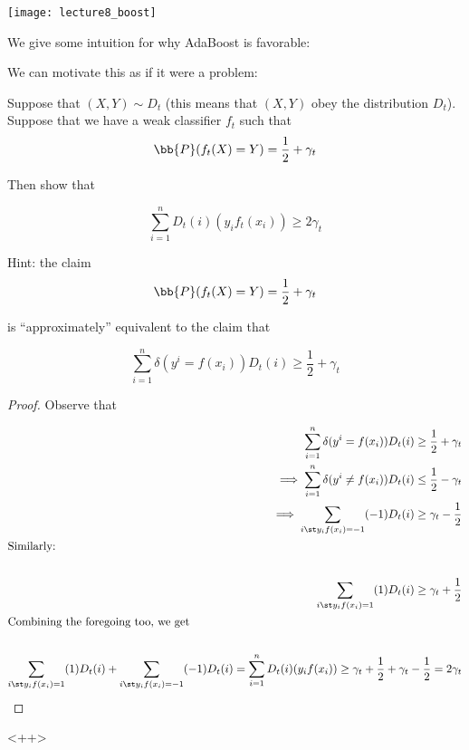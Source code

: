 \documentclass[../main.tex]{subfiles}
\begin{document}
    \begin{center}
        \texttt{[image: lecture8\_boost]}
    \end{center}

    \begin{remark}
        We give some intuition for why AdaBoost is favorable:

        We can motivate this as if it were a problem:

        \begin{problem}{1}
            Suppose that $(X,Y) \sim D_t$ (this means that $(X,Y)$ obey the distribution
            $D_t$). Suppose that we have a weak classifier $f_t$ such that
            \[
                \bb{P}(f_{t}(X) = Y) = \frac{1}{2} + \gamma_t
            \]

            Then show that

            \[
                \sum_{i=1}^{n}D_{t}(i)\left(y_{i}f_{t}(x_{i}) \right) \geq 2\gamma_t
            \]

            Hint: the claim
            \[
                \bb{P}(f_{t}(X) = Y) = \frac{1}{2} + \gamma_t
            \]

            is ``approximately'' equivalent to the claim that

            \[
                \sum_{i=1}^{n}\delta(y^{i} = f(x_i))D_t(i) \geq \frac{1}{2} + \gamma_t
            \]
        \end{problem}

        \begin{proof}
            
            Observe that

            \begin{align*}
                \sum_{i=1}^{n}\delta(y^{i} = f(x_i))D_t(i) \geq \frac{1}{2} + \gamma_t \\
                \implies \sum_{i=1}^{n}\delta(y^{i} \not = f(x_i))D_t(i) \leq \frac{1}{2} - \gamma_t \\
                \implies \sum_{i \st y_i f(x_i) = -1}^{}(-1)D_t(i) \geq \gamma_t - \frac{1}{2} \\
                \intertext{Similarly:} \\
                \sum_{i \st y_i f(x_i) = 1}^{}(1)D_t(i) \geq \gamma_t + \frac{1}{2} \\
                \intertext{Combining the foregoing too, we get} \\
                \sum_{i \st y_i f(x_i) = 1}^{}(1)D_t(i) + \sum_{i \st y_i f(x_i) = -1}^{}(-1)D_t(i) = \sum_{i=1}^{n}D_t(i)(y_{i}f(x_{i})) \geq \gamma_t + \frac{1}{2} + \gamma_t - \frac{1}{2} = 2 \gamma_t \\
            \end{align*}
        \end{proof}<++>



\end{remark}
\end{document}
